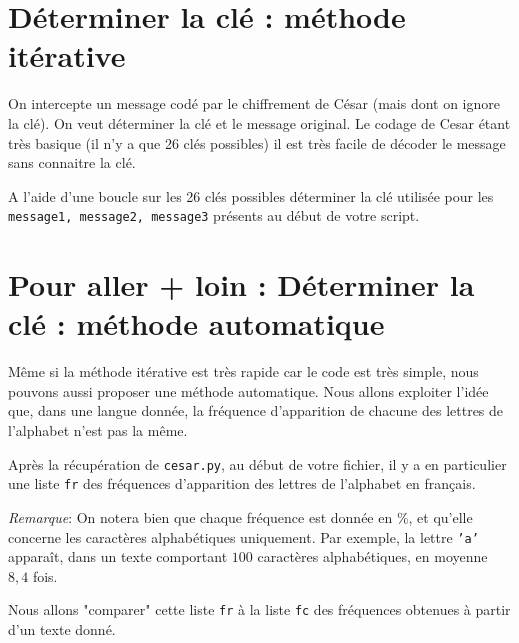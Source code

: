 \section{Déterminer la clé : méthode itérative}
On intercepte un message codé par le chiffrement de César (mais dont on ignore la clé). On veut déterminer la clé et le message original. 
Le codage de Cesar étant très basique (il n'y a que 26 clés possibles) il est très facile de décoder le message sans connaitre la clé.\\

\begin{question}
A l'aide d'une boucle sur les 26 clés possibles déterminer la clé utilisée pour les \texttt{message1, message2, message3} présents au début de votre script.
\end{question}


\section{Pour aller + loin : Déterminer la clé : méthode automatique}

Même si la méthode itérative est très rapide car le code est très simple, nous pouvons aussi proposer une méthode automatique.
Nous allons exploiter l'idée que, dans une langue donnée, la fréquence d'apparition de chacune des lettres de l'alphabet n'est pas la même. 

Après la récupération de \texttt{cesar.py}, au début de votre fichier, il y a en particulier une liste \texttt{fr} des fréquences d'apparition %
des lettres de l'alphabet en français.

\emph{Remarque}: On notera bien que chaque fréquence est donnée en \%, et  qu'elle concerne les caractères alphabétiques uniquement. Par exemple, la lettre \texttt{'a'} apparaît, dans un texte comportant  $100$ caractères alphabétiques, en moyenne $8,4$ fois.

Nous allons "comparer" cette liste \texttt{fr} à la liste \texttt{fc} des fréquences obtenues à partir d'un texte donné.


